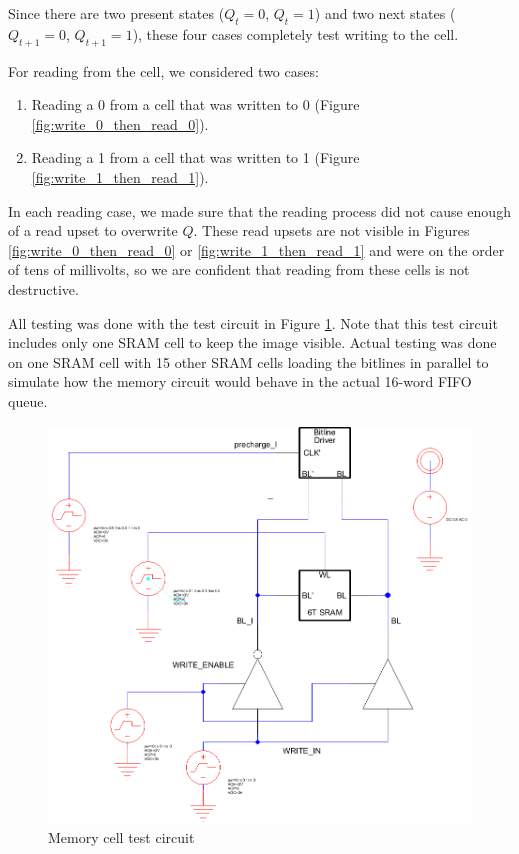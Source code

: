 \documentclass[12pt]{report}
\begin{document}
Since there are two present states ($Q_t = 0$, $Q_t = 1$) and two next states ($Q_{t+1} = 0$, $Q_{t+1} = 1$), these four cases completely test writing to the cell.

For reading from the cell, we considered two cases:
\begin{enumerate}
\item Reading a 0 from a cell that was written to 0 (Figure \ref{fig:write_0_then_read_0}).
\item Reading a 1 from a cell that was written to 1 (Figure \ref{fig:write_1_then_read_1}).
\end{enumerate}

In each reading case, we made sure that the reading process did not cause enough of a read upset to overwrite $Q$. These read upsets are not visible in Figures \ref{fig:write_0_then_read_0} or \ref{fig:write_1_then_read_1} and were on the order of tens of millivolts, so we are confident that reading from these cells is not destructive.

All testing was done with the test circuit in Figure \ref{fig:test_circuit}. Note that this test circuit includes only one SRAM cell to keep the image visible. Actual testing was done on one SRAM cell with 15 other SRAM cells loading the bitlines in parallel to simulate how the memory circuit would behave in the actual 16-word FIFO queue.

\begin{figure}[H]
  \centering
    \includegraphics[width=1.0\textwidth]{test_circuit.PNG}
  \caption{Memory cell test circuit}
  \label{fig:test_circuit}
\end{figure}
\end{document}
